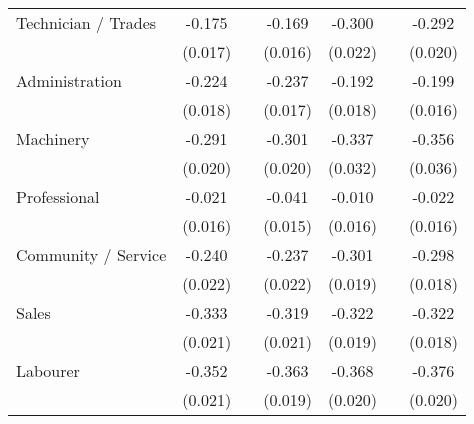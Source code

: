 {\begin{tabular}{l*{6}{c}}
Technician / Trades &      -0.175\sym{***}&                     &      -0.169\sym{***}&      -0.300\sym{***}&                     &      -0.292\sym{***}\\
                    &     (0.017)         &                     &     (0.016)         &     (0.022)         &                     &     (0.020)         \\
Administration      &      -0.224\sym{***}&                     &      -0.237\sym{***}&      -0.192\sym{***}&                     &      -0.199\sym{***}\\
                    &     (0.018)         &                     &     (0.017)         &     (0.018)         &                     &     (0.016)         \\
Machinery           &      -0.291\sym{***}&                     &      -0.301\sym{***}&      -0.337\sym{***}&                     &      -0.356\sym{***}\\
                    &     (0.020)         &                     &     (0.020)         &     (0.032)         &                     &     (0.036)         \\
Professional        &      -0.021         &                     &      -0.041\sym{***}&      -0.010         &                     &      -0.022         \\
                    &     (0.016)         &                     &     (0.015)         &     (0.016)         &                     &     (0.016)         \\
Community / Service &      -0.240\sym{***}&                     &      -0.237\sym{***}&      -0.301\sym{***}&                     &      -0.298\sym{***}\\
                    &     (0.022)         &                     &     (0.022)         &     (0.019)         &                     &     (0.018)         \\
Sales               &      -0.333\sym{***}&                     &      -0.319\sym{***}&      -0.322\sym{***}&                     &      -0.322\sym{***}\\
                    &     (0.021)         &                     &     (0.021)         &     (0.019)         &                     &     (0.018)         \\
Labourer            &      -0.352\sym{***}&                     &      -0.363\sym{***}&      -0.368\sym{***}&                     &      -0.376\sym{***}\\
                    &     (0.021)         &                     &     (0.019)         &     (0.020)         &                     &     (0.020)         \\

\end{tabular}}
